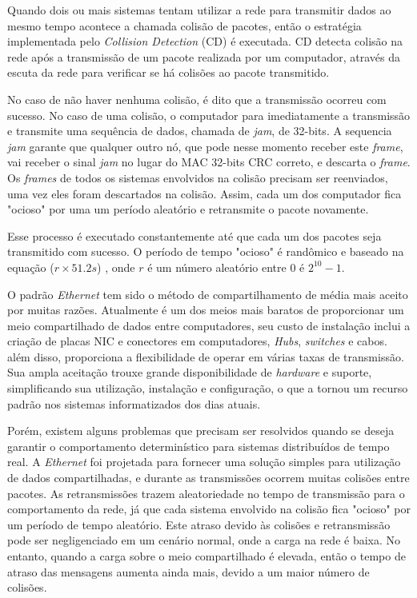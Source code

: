 \documentclass[conference]{IEEEtran}
\begin{document}
Quando dois ou mais sistemas tentam utilizar a rede para transmitir dados ao mesmo tempo acontece a chamada colisão de pacotes, então o estratégia implementada pelo \textit{Collision Detection} (CD) é executada. CD detecta colisão na rede após a transmissão de um pacote realizada por um computador, através da escuta da rede para verificar se há colisões ao pacote transmitido.

No caso de não haver nenhuma colisão, é dito que a transmissão ocorreu com sucesso. No caso de uma colisão, o computador para imediatamente a transmissão e transmite uma sequência de dados, chamada de \textit{jam}, de 32-bits. A sequencia \textit{jam} garante que qualquer outro nó, que pode nesse momento receber este \textit{frame}, vai receber o sinal \textit{jam} no lugar do MAC 32-bits CRC correto, e descarta o \textit{frame}. Os \textit{frames} de todos os sistemas envolvidos na colisão precisam ser reenviados, uma vez eles foram descartados na colisão. Assim, cada um dos computador fica "ocioso" por uma um período aleatório e retransmite o pacote novamente.

Esse processo é executado constantemente até que cada um dos pacotes seja transmitido com sucesso. O período de tempo "ocioso" é randômico e baseado na equação ($r \times 51.2s$) , onde $r$ é um número aleatório entre $0$ é $2^{10}-1$.

O padrão \textit{Ethernet} tem sido o método de compartilhamento de média mais aceito por muitas razões. Atualmente é um dos meios mais baratos de proporcionar um meio compartilhado de dados entre computadores, seu custo de instalação inclui a criação de placas NIC e conectores em computadores, \textit{Hubs}, \textit{switches} e cabos. além disso, proporciona a flexibilidade de operar em várias taxas de transmissão. Sua ampla aceitação trouxe grande disponibilidade de \textit{hardware} e suporte, simplificando sua utilização, instalação e configuração, o que a tornou um recurso padrão nos sistemas informatizados dos dias atuais.

Porém, existem alguns problemas que precisam ser resolvidos quando se deseja garantir o comportamento determinístico para sistemas distribuídos de tempo real. A \textit{Ethernet\textsl{}} foi projetada para fornecer uma solução simples para utilização de dados compartilhadas, e durante as transmissões ocorrem muitas colisões entre pacotes. As retransmissões trazem aleatoriedade no tempo de transmissão para o comportamento da rede, já que cada sistema envolvido na colisão fica "ocioso" por um período de tempo aleatório. Este atraso devido às colisões e retransmissão pode ser negligenciado em um cenário normal, onde a carga na rede é baixa. No entanto, quando a carga sobre o meio compartilhado é elevada, então o tempo de atraso das mensagens aumenta ainda mais, devido a um maior número de colisões.
\end{document}
